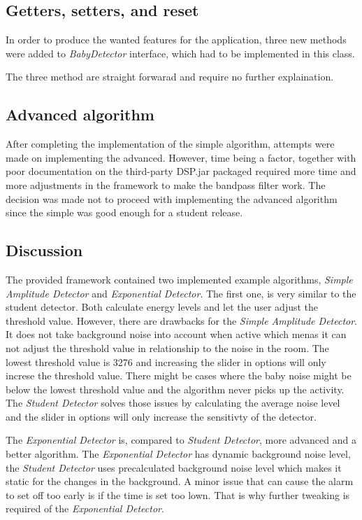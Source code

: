 \subsection{Getters, setters, and reset}
In order to produce the wanted features for the application, three new methods 
were added to \emph{BabyDetector} interface, which had to be implemented in this
class.

The three method are straight forwarad and require no further explaination.


\subsection{Advanced algorithm}
After completing the implementation of the simple algorithm, attempts were made
on implementing the advanced. However, time being a factor, together with poor
documentation on the third-party DSP.jar packaged required more time and more
adjustments in the framework to make the bandpass filter work. The decision was
made not to proceed with implementing the advanced algorithm since the simple
was good enough for a student release.

\subsection{Discussion}
The provided framework contained two implemented example algorithms,
\emph{Simple Amplitude Detector} and \emph{Exponential Detector}. The first one,
is very similar to the student detector. Both calculate energy levels and let
the user adjust the threshold value. However, there are drawbacks for the \emph{Simple
Amplitude Detector}. It does not take background noise into account when
active which menas it can not adjust the threshold value in relationship to
the noise in the room. The lowest threshold value is 3276 and increasing the
slider
in options will only increse the threshold value. There might be cases where the
baby noise might be below the lowest threshold value and the algorithm never
picks up the activity. The \emph{Student Detector} solves those issues by
calculating the average noise level and the slider in options will only increase
the sensitivty of the detector.

The \emph{Exponential Detector} is, compared to \emph{Student Detector}, more
advanced and a better algorithm. The \emph{Exponential Detector} has dynamic 
background noise level, the \emph{Student Detector} uses precalculated background 
noise level which makes it static for the changes in the background.
A minor issue that can cause the alarm to set off too early is if the 
time is set too lown. That is why further tweaking is required of the
\emph{Exponential Detector}.

